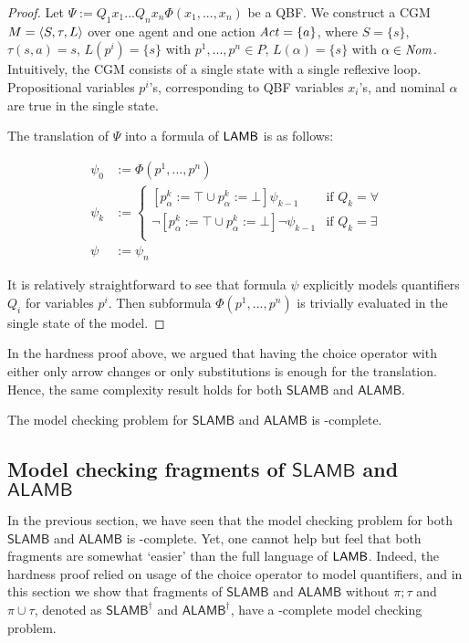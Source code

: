 {\begin{proof}
Let $\Psi := Q_1 x_1 ... Q_n x_n \Phi (x_1, ..., x_n)$ be a QBF. We construct a CGM $M = \langle S, \tau, L\rangle$ over one agent and one action $\mathit{Act} = \{a\}$, where $S = \{s\}$, $\tau(s , a) = s$, $L(p^i) = \{s\}$ with $p^1, ..., p^n \in P$, $L(\alpha) = \{s\}$ with $\alpha \in \mathit{Nom}$. Intuitively, the CGM consists of a single state with a single reflexive loop. Propositional variables $p^i$'s, corresponding to QBF variables $x_i$'s, and nominal $\alpha$ are true in the single state. 

The translation of $\Psi$ into a formula of $\mathsf{LAMB}$ is as follows:

\begin{align*}
    \psi_0 &:= \Phi(p^1, ..., p^n) \\
    \psi_k &:=
    \begin{cases}
        [p^k_\alpha:= \top \cup p^k_\alpha := \bot] \psi_{k-1} &\text{if } Q_k = \forall\\ 
        \lnot [p^k_\alpha:= \top \cup p^k_\alpha := \bot] \lnot \psi_{k-1} &\text{if } Q_k = \exists\\
    \end{cases}\\
\psi &:= \psi_n
\end{align*}

It is relatively straightforward to see that formula $\psi$ explicitly models quantifiers $Q_i$ for variables $p^i$. Then subformula  $\Phi(p^1, ..., p^n)$ is trivially evaluated in the single state of the model. 
\end{proof}

In the hardness proof above, we argued that having the choice operator with either only arrow changes or only substitutions is enough for the translation. Hence, the same complexity result holds for both $\mathsf{SLAMB}$ and $\mathsf{ALAMB}$. 

\begin{corollary}
The model checking problem for $\mathsf{SLAMB}$ and $\mathsf{ALAMB}$ is \Pspace-complete.
\end{corollary}

\subsection{Model checking fragments of $\mathsf{SLAMB}$ and $\mathsf{ALAMB}$}
In the previous section, we have seen that the model checking problem for both $\mathsf{SLAMB}$ and $\mathsf{ALAMB}$ is \Pspace-complete. Yet, one cannot help but feel that both fragments are somewhat `easier' than the full language of $\mathsf{LAMB}$. Indeed, the hardness proof relied on usage of the choice operator to model quantifiers, and in this section we show that fragments of $\mathsf{SLAMB}$ and $\mathsf{ALAMB}$ without $\pi; \tau$ and $\pi \cup \tau$, denoted as $\mathsf{SLAMB}^\dag$ and $\mathsf{ALAMB}^\dag$, have a \Ptime-complete model checking problem. }
\fi